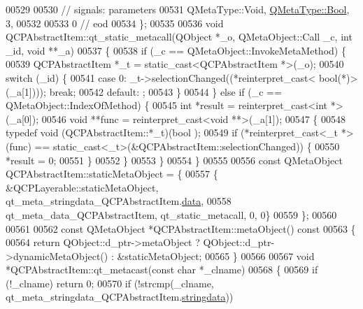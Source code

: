 \begin{DoxyCode}
00529 
00530  \textcolor{comment}{// signals: parameters}
00531     QMetaType::Void, \hyperlink{a00001_a76a8b016e5ad61faf9062cc387df5016}{QMetaType::Bool},    3,
00532 
00533        0        \textcolor{comment}{// eod}
00534 \};
00535 
00536 \textcolor{keywordtype}{void} QCPAbstractItem::qt\_static\_metacall(QObject *\_o, QMetaObject::Call \_c, \textcolor{keywordtype}{int} \_id, \textcolor{keywordtype}{void} **\_a)
00537 \{
00538     \textcolor{keywordflow}{if} (\_c == QMetaObject::InvokeMetaMethod) \{
00539         QCPAbstractItem *\_t = \textcolor{keyword}{static\_cast<}QCPAbstractItem *\textcolor{keyword}{>}(\_o);
00540         \textcolor{keywordflow}{switch} (\_id) \{
00541         \textcolor{keywordflow}{case} 0: \_t->selectionChanged((*\textcolor{keyword}{reinterpret\_cast<} \textcolor{keywordtype}{bool}(*)\textcolor{keyword}{>}(\_a[1]))); \textcolor{keywordflow}{break};
00542         \textcolor{keywordflow}{default}: ;
00543         \}
00544     \} \textcolor{keywordflow}{else} \textcolor{keywordflow}{if} (\_c == QMetaObject::IndexOfMethod) \{
00545         \textcolor{keywordtype}{int} *result = \textcolor{keyword}{reinterpret\_cast<}\textcolor{keywordtype}{int} *\textcolor{keyword}{>}(\_a[0]);
00546         \textcolor{keywordtype}{void} **func = \textcolor{keyword}{reinterpret\_cast<}\textcolor{keywordtype}{void} **\textcolor{keyword}{>}(\_a[1]);
00547         \{
00548             \textcolor{keyword}{typedef} void (QCPAbstractItem::*\_t)(bool );
00549             \textcolor{keywordflow}{if} (*reinterpret\_cast<\_t *>(func) == \textcolor{keyword}{static\_cast<}\_t\textcolor{keyword}{>}(&QCPAbstractItem::selectionChanged)) \{
00550                 *result = 0;
00551             \}
00552         \}
00553     \}
00554 \}
00555 
00556 \textcolor{keyword}{const} QMetaObject QCPAbstractItem::staticMetaObject = \{
00557     \{ &QCPLayerable::staticMetaObject, qt\_meta\_stringdata\_QCPAbstractItem.\hyperlink{a00016_ab4317fd8db7c91bab9009e558b7cb145}{data},
00558       qt\_meta\_data\_QCPAbstractItem,  qt\_static\_metacall, 0, 0\}
00559 \};
00560 
00561 
00562 \textcolor{keyword}{const} QMetaObject *QCPAbstractItem::metaObject()\textcolor{keyword}{ const}
00563 \textcolor{keyword}{}\{
00564     \textcolor{keywordflow}{return} QObject::d\_ptr->metaObject ? QObject::d\_ptr->dynamicMetaObject() : &staticMetaObject;
00565 \}
00566 
00567 \textcolor{keywordtype}{void} *QCPAbstractItem::qt\_metacast(\textcolor{keyword}{const} \textcolor{keywordtype}{char} *\_clname)
00568 \{
00569     \textcolor{keywordflow}{if} (!\_clname) \textcolor{keywordflow}{return} 0;
00570     \textcolor{keywordflow}{if} (!strcmp(\_clname, qt\_meta\_stringdata\_QCPAbstractItem.\hyperlink{a00016_ade6e562aa7d6defc621f68d53679440b}{stringdata}))

\end{DoxyCode}
